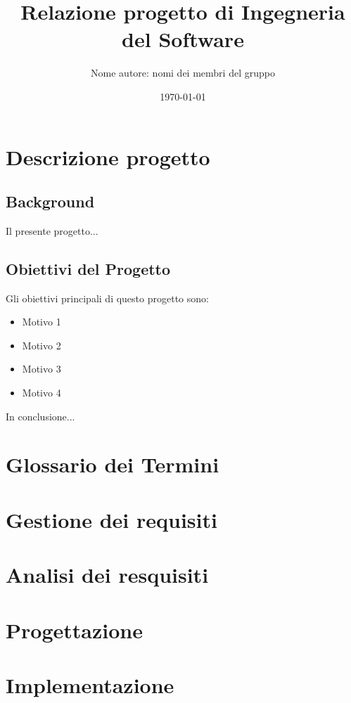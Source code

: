 \documentclass{report}
\title{Relazione progetto di Ingegneria del Software}
\author{Nome autore: nomi dei membri del gruppo}
\date{\today}
\begin{document}
	
	\maketitle
	
	\tableofcontents
	
	\chapter{Descrizione progetto}
	
	\section{Background}
	Il presente progetto...
	
	\section{Obiettivi del Progetto}
	Gli obiettivi principali di questo progetto sono:
	\begin{itemize}
		\item Motivo 1
		\item Motivo 2
		\item Motivo 3
		\item Motivo 4
	\end{itemize}
	
	In conclusione...
	
	\chapter{Glossario dei Termini}
	
	\chapter{Gestione dei requisiti}
	
	\chapter{Analisi dei resquisiti}
	
	\chapter{Progettazione}
	
	\chapter{Implementazione}
	
\end{document}
